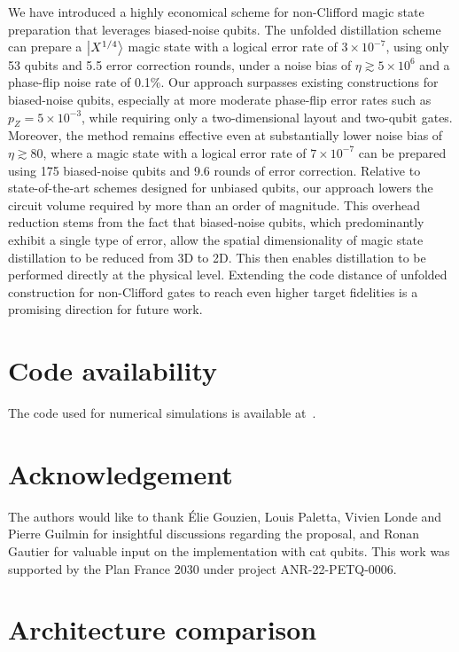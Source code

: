 \documentclass[%
 reprint,
superscriptaddress,
 amsmath,amssymb,
 aps,
]{revtex4-2}
\begin{document}
We have introduced a highly economical scheme for non-Clifford magic state preparation that leverages biased-noise qubits. The unfolded distillation scheme can prepare a $\ket{X^{1/4}}$ magic state with a logical error rate of $3 \times 10^{-7}$, using only 53 qubits and 5.5 error correction rounds, under a noise bias of $\eta \gtrsim 5 \times 10^6$ and a phase-flip noise rate of 0.1\%. Our approach surpasses existing constructions for biased-noise qubits, especially at more moderate phase-flip error rates such as $p_Z = 5 \times 10^{-3}$, while requiring only a two-dimensional layout and two-qubit gates. Moreover, the method remains effective even at substantially lower noise bias of $\eta \gtrsim 80$, where a magic state with a logical error rate of $7 \times 10^{-7}$ can be prepared using 175 biased-noise qubits and 9.6 rounds of error correction. Relative to state-of-the-art schemes designed for unbiased qubits, our approach lowers the circuit volume required by more than an order of magnitude. This overhead reduction stems from the fact that biased-noise qubits, which predominantly exhibit a single type of error, allow the spatial dimensionality of magic state distillation to be reduced from 3D to 2D. This then enables distillation to be performed directly at the physical level. Extending the code distance of unfolded construction for non-Clifford gates to reach even higher target fidelities is a promising direction for future work.

\section*{Code availability}
The code used for numerical simulations is available at~\cite{CodeGithub}.

\section*{Acknowledgement}

The authors would like to thank Élie Gouzien, Louis Paletta, Vivien Londe and Pierre Guilmin for insightful discussions regarding the proposal, and Ronan Gautier for valuable input on the implementation with cat qubits. This work was supported by the Plan France 2030 under project ANR-22-PETQ-0006. 

\appendix 

\section{Architecture comparison}
\label{app:architecture comparison}
\end{document}
